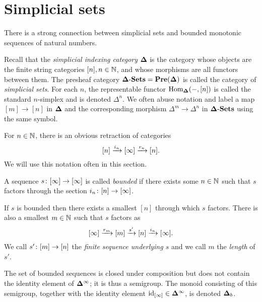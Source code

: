 \documentclass{amsart}
\def\Del{{\bf \Delta}}
\def\dashSets{{\tn{-}\Sets}}
\def\Delinf{{\Del^\infty}}
\def\Delb{{\Del_b}}
\begin{document}
\section{Simplicial sets}

There is a strong connection between simplicial sets and bounded monotonic sequences of natural numbers.  

Recall that the {\em simplicial indexing category} $\Del$ is the category whose objects are the finite string categories $[n], n\in{\mathbb N}$, and whose morphisms are all functors between them.  The presheaf category $\Del\dashSets=\Pre(\Del)$ is called the category of {\em simplicial sets}.  For each $n$, the representable functor $\Hom_\Del(-,[n])$ is called the standard $n$-simplex and is denoted $\Delta^n$.  We often abuse notation and label a map $[m]\to[n]$ in $\Del$ and the corresponding morphism $\Delta^m\to\Delta^n$ in $\Del\dashSets$ using the same symbol.

For $n\in{\mathbb N}$, there is an obvious retraction of categories $$[n]\xrightarrow{i_n}[\infty]\xrightarrow{r_n}[n].$$  We will use this notation often in this section.

\begin{definition}

A sequence $s\colon[\infty]\rightarrow[\infty]$ is called {\em bounded} if there exists some $n\in{\mathbb N}$ such that $s$ factors through the section $i_n\colon[n]\rightarrow[\infty]$.  

If $s$ is bounded then there exists a smallest $[n]$ through which $s$ factors.  There is also a smallest $m\in{\mathbb N}$ such that $s$ factors as $$[\infty]\xrightarrow{r_m}[m]\xrightarrow{s'}[n]\xrightarrow{i_n}[\infty].$$  We call $s'\colon[m]\rightarrow[n]$ the {\em finite sequence underlying $s$} and we call $m$ the {\em length} of $s'$.

The set of bounded sequences is closed under composition but does not contain the identity element of $\Delinf$; it is thus a semigroup.  The monoid consisting of this semigroup, together with the identity element $\id_{[\infty]}\in\Delinf$, is denoted $\Delb$.

\end{definition}

\begin{proposition}



\end{proposition}



\end{document}
